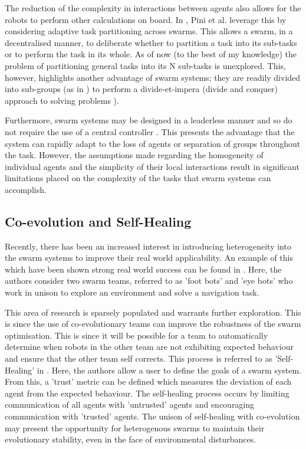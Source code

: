 \documentclass[preprint,11pt]{report}
\begin{document}
The reduction of the complexity in interactions between agents also allows for the robots to perform
other calculations on board. In \cite{Pini2011TaskSelection}, Pini et al. leverage this by
considering adaptive task partitioning across swarms. This allows a swarm, in a decentralised
manner, to deliberate whether to partition a task into its sub-tasks or to perform the task in its
whole. As of now (to the best of my knowledge) the problem of partitioning general tasks into its N
sub-tasks is unexplored. This, however, highlights another advantage of swarm systems; they are
readily divided into sub-groups (as in \cite{Zahadat2016DivisionInhibition}) to perform a
divide-et-impera (divide and conquer) approach to solving problems \cite{Pini2011TaskSelection}). 

Furthermore, swarm systems may be designed in a leaderless manner and so do not require the use of a
central controller \cite{Couceiro2015}. This presents the advantage that the system can rapidly
adapt to the loss of agents or separation of groups throughout the task. However, the assumptions
made regarding the homogeneity of individual agents and the simplicity of their local interactions
result in significant limitations placed on the complexity of the tasks that swarm systems can
accomplish. 

\subsection{Co-evolution and Self-Healing}

Recently, there has been an increased interest in introducing heterogeneity into the swarm systems
to improve their real world applicability. An example of this which have been shown strong real
world success can be found in \cite{DucatelleSelf-organizedSwarms}. Here, the authors consider two
swarm teams, referred to as 'foot bots' and 'eye bots' who work in unison to explore an environment
and solve a navigation task. 

This area of research is sparsely populated and warrants further exploration. This is since the use
of co-evolutionary teams can improve the robustness of the swarm optimisation. This is since it will
be possible for a team to automatically determine when robots in the other team are not exhibiting
expected behaviour and ensure that the other team self corrects. This process is referred to as
'Self-Healing' in \cite{LiuTrust-Aware}. Here, the authors allow a user to define the goals of a
swarm system. From this, a 'trust' metric can be defined which measures the deviation of each agent
from the expected behaviour. The self-healing process occurs by limiting communication of all agents
with 'untrusted' agents and encouraging communication with 'trusted' agents. The unison of
self-healing with co-evolution may present the opportunity for heterogenous swarms to maintain their
evolutionary stability, even in the face of environmental disturbances.
\end{document}
